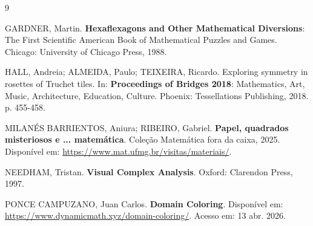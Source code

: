\documentclass[12pt,oneside,a4paper]{article}
\begin{document}
\renewcommand{\refname}{Bibliografia}
  \begin{thebibliography}{9}


GARDNER, Martin. \textbf{Hexaflexagons and Other Mathematical Diversions}: The First Scientific American Book of Mathematical Puzzles and Games. Chicago: University of Chicago Press, 1988.

HALL, Andreia; ALMEIDA, Paulo; TEIXEIRA, Ricardo. Exploring symmetry in rosettes of Truchet tiles. In: \textbf{Proceedings of Bridges 2018}: Mathematics, Art, Music, Architecture, Education, Culture. Phoenix: Tessellations Publishing, 2018. p. 455-458.

MILANÉS BARRIENTOS, Aniura; RIBEIRO, Gabriel. \textbf{Papel, quadrados misteriosos e ... matemática}. Coleção Matemática fora da caixa, 2025. Disponível em: \url{https://www.mat.ufmg.br/visitas/materiais/}.

NEEDHAM, Tristan. \textbf{Visual Complex Analysis}. Oxford: Clarendon Press, 1997.

PONCE CAMPUZANO, Juan Carlos. \textbf{Domain Coloring}. Disponível em: \url{https://www.dynamicmath.xyz/domain-coloring/}. Acesso em: 13 abr. 2026.

\end{thebibliography}
\end{document}
